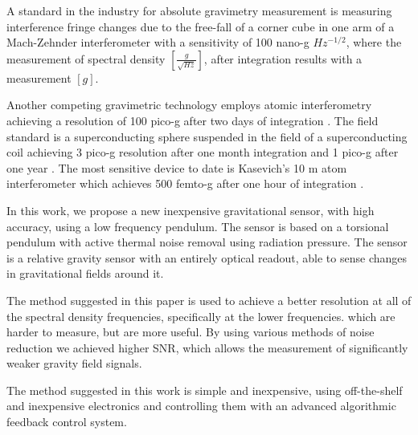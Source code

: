 \documentclass[\main/master.tex]{subfiles}
\begin{document}
\fi
\par\noindent
A standard in the industry for absolute gravimetry measurement is measuring interference fringe changes due to the free-fall of a corner cube in one arm of a Mach-Zehnder interferometer with a sensitivity of 100 nano-g $Hz^{-1/2}$, where the measurement of spectral density $[\frac{g}{\sqrt{Hz}}]$, after integration results with a measurement $[g]$.
\par\noindent
Another competing gravimetric technology employs atomic interferometry achieving a resolution of 100 pico-g after two days of integration \cite{Peters01}. The field standard is a superconducting sphere suspended in the field of a superconducting coil achieving 3 pico-g resolution after one month integration and 1 pico-g  after one year \cite{Goodkind99}. 
The most sensitive device to date is Kasevich's 10 m atom interferometer which achieves 500 femto-g after one hour of integration \cite{PhysRevA.91.033629,kasevich2014prospects}. 
\par\noindent
In this work, we propose a new inexpensive gravitational sensor, with high accuracy, using a low frequency pendulum. The sensor is based on a torsional pendulum with active thermal noise removal using radiation pressure. The sensor is a relative gravity sensor with an entirely optical readout, able to sense changes in gravitational fields around it. 

\par\noindent
The method suggested in this paper is used to achieve a better resolution at all of the spectral density frequencies, specifically at the lower frequencies. which are harder to measure, but are more useful. By using various methods of noise reduction we achieved higher SNR, which allows the measurement of significantly weaker gravity field signals.
\par\noindent
The method suggested in this work is simple and inexpensive, using off-the-shelf and inexpensive electronics and controlling them with an advanced algorithmic feedback control system.
 
\end{document}
